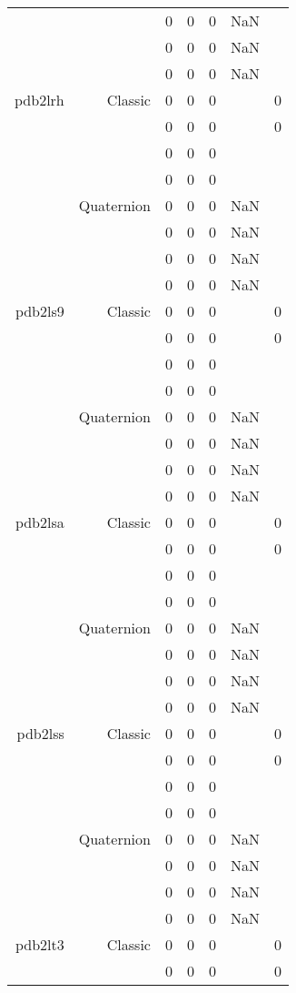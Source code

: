 \begin{xltabular}{\textwidth}{r|rcccSc}
& & 0 & 0 & 0 & NaN & \\
& & 0 & 0 & 0 & NaN & \\
& & 0 & 0 & 0 & NaN & \\ \addlinespace
pdb2lrh & Classic & 0 & 0 & 0 & & 0 \\
& & 0 & 0 & 0 & & 0 \\
& & 0 & 0 & 0 & & \\
& & 0 & 0 & 0 & & \\
& Quaternion & 0 & 0 & 0 & NaN & \\
& & 0 & 0 & 0 & NaN & \\
& & 0 & 0 & 0 & NaN & \\
& & 0 & 0 & 0 & NaN & \\ \addlinespace
pdb2ls9 & Classic & 0 & 0 & 0 & & 0 \\
& & 0 & 0 & 0 & & 0 \\
& & 0 & 0 & 0 & & \\
& & 0 & 0 & 0 & & \\
& Quaternion & 0 & 0 & 0 & NaN & \\
& & 0 & 0 & 0 & NaN & \\
& & 0 & 0 & 0 & NaN & \\
& & 0 & 0 & 0 & NaN & \\ \addlinespace
pdb2lsa & Classic & 0 & 0 & 0 & & 0 \\
& & 0 & 0 & 0 & & 0 \\
& & 0 & 0 & 0 & & \\
& & 0 & 0 & 0 & & \\
& Quaternion & 0 & 0 & 0 & NaN & \\
& & 0 & 0 & 0 & NaN & \\
& & 0 & 0 & 0 & NaN & \\
& & 0 & 0 & 0 & NaN & \\ \addlinespace
pdb2lss & Classic & 0 & 0 & 0 & & 0 \\
& & 0 & 0 & 0 & & 0 \\
& & 0 & 0 & 0 & & \\
& & 0 & 0 & 0 & & \\
& Quaternion & 0 & 0 & 0 & NaN & \\
& & 0 & 0 & 0 & NaN & \\
& & 0 & 0 & 0 & NaN & \\
& & 0 & 0 & 0 & NaN & \\ \addlinespace
pdb2lt3 & Classic & 0 & 0 & 0 & & 0 \\
& & 0 & 0 & 0 & & 0 \\

\end{xltabular}
